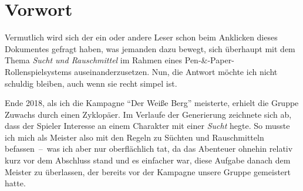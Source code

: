 
\chapter*{Vorwort}
Vermutlich wird sich der ein oder andere Leser schon beim Anklicken dieses Dokumentes gefragt haben, was jemanden dazu bewegt, sich überhaupt mit dem Thema \emph{Sucht und Rauschmittel} im Rahmen eines Pen-\&-Paper-Rollenspielsystems auseinanderzusetzen. Nun, die Antwort möchte ich nicht schuldig bleiben, auch wenn sie recht simpel ist.

Ende 2018, als ich die Kampagne \enquote{Der Weiße Berg} \cite{WB1,WB2} meisterte, erhielt die Gruppe Zuwachs durch einen Zyklopäer. Im Verlaufe der Generierung zeichnete sich ab, dass der Spieler Interesse an einem Charakter mit einer \emph{Sucht} hegte. So musste ich mich als Meister also mit den Regeln zu Süchten und Rauschmitteln befassen~--~was ich aber nur oberflächlich tat, da das Abenteuer ohnehin relativ kurz vor dem Abschluss stand und es einfacher war, diese Aufgabe danach dem Meister zu überlassen, der bereits vor der Kampagne unsere Gruppe gemeistert hatte.

